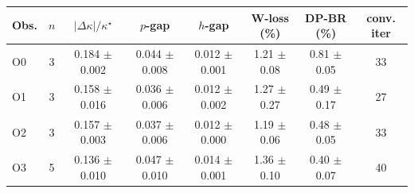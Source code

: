 \begin{tabular}{lccccccc}
\toprule
Obs. & $n$ & $|\Delta\kappa|/\kappa^\star$ & $p$-gap & $h$-gap & W-loss (\%) & DP-BR (\%) & conv. iter\\
\midrule
O0 & 3 & 0.184 $\pm$ 0.002 & 0.044 $\pm$ 0.008 & 0.012 $\pm$ 0.001 & 1.21 $\pm$ 0.08 & 0.81 $\pm$ 0.05 & 33\\
O1 & 3 & 0.158 $\pm$ 0.016 & 0.036 $\pm$ 0.006 & 0.012 $\pm$ 0.002 & 1.27 $\pm$ 0.27 & 0.49 $\pm$ 0.17 & 27\\
O2 & 3 & 0.157 $\pm$ 0.003 & 0.037 $\pm$ 0.006 & 0.012 $\pm$ 0.000 & 1.19 $\pm$ 0.06 & 0.48 $\pm$ 0.05 & 33\\
O3 & 5 & 0.136 $\pm$ 0.010 & 0.047 $\pm$ 0.010 & 0.014 $\pm$ 0.001 & 1.36 $\pm$ 0.10 & 0.40 $\pm$ 0.07 & 40\\
\bottomrule
\end{tabular}
